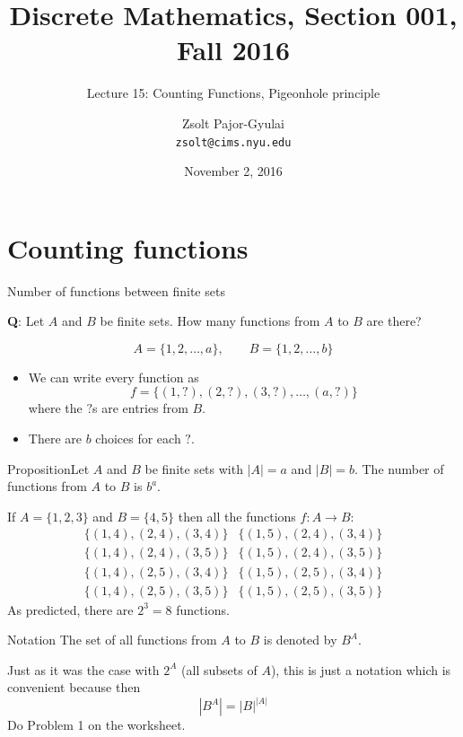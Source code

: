 \documentclass{beamer}
\title{Discrete Mathematics, Section 001, Fall 2016}
\subtitle{Lecture 15: Counting Functions, Pigeonhole principle}
\author[Zsolt]{Zsolt Pajor-Gyulai \\ \texttt{zsolt@cims.nyu.edu}}
\date{November 2, 2016}
\institute[NYU] 
{
\normalsize Courant Institute of Mathematical Sciences
}
\def\bl[#1]#2{\begin{block}{#1}#2\end{block}}
\def\itemb{\begin{itemize}}
\def\iteme{\end{itemize}}
\begin{document}
\begin{frame}
  \titlepage
\end{frame}


\section{Counting functions}

\begin{frame}{Number of functions between finite sets}
\bl[]{\textbf{Q}: Let $A$ and $B$ be finite sets. How many functions from $A$ to $B$ are there?}
\[
A=\{1,2,\dots,a\},\qquad B=\{1,2,\dots,b\}
\]
\itemb
\item We can write every function as
\[
f=\{(1,?),(2,?),(3,?),\dots,(a,?)\}
\]
where the $?$s are entries from $B$.
\item There are $b$ choices for each $?$.
\iteme
\bl[Proposition]{Let $A$ and $B$ be finite sets with $|A|=a$ and $|B|=b$. The number of functions from $A$ to $B$ is $b^a$.}
\end{frame}

\begin{frame}
If $A=\{1,2,3\}$ and $B=\{4,5\}$ then all the functions $f:A\to B$:
\[
\begin{array}{cc}
\{(1,4),(2,4),(3,4)\}&\{(1,5),(2,4),(3,4)\}\\
\{(1,4),(2,4),(3,5)\}&\{(1,5),(2,4),(3,5)\}\\
\{(1,4),(2,5),(3,4)\}&\{(1,5),(2,5),(3,4)\}\\
\{(1,4),(2,5),(3,5)\}&\{(1,5),(2,5),(3,5)\}
\end{array}
\]
As predicted, there are $2^3=8$ functions.
\bl[Notation]{
The set of all functions from $A$ to $B$ is denoted by $B^A$.
}
Just as it was the case with $2^A$ (all subsets of $A$), this is just a notation which is convenient because then
\[
|B^A|=|B|^{|A|}
\]
\center Do Problem 1 on the worksheet.

\end{frame}
\end{document}
